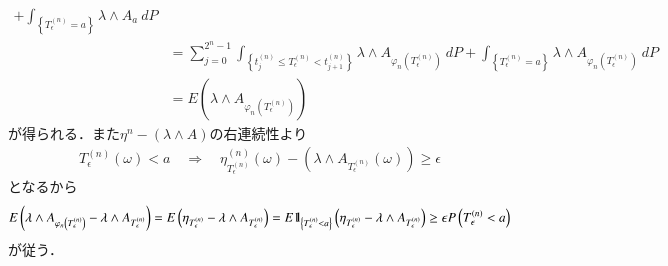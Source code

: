 \begin{prf}
\begin{description}
\begin{align}
						+ \int_{\left\{T^{(n)}_\epsilon = a\right\}} \lambda \wedge A_a\ dP \\
					&= \sum_{j=0}^{2^n-1} \int_{\left\{t^{(n)}_j \leq T^{(n)}_\epsilon < t^{(n)}_{j+1}\right\}} \lambda \wedge A_{\varphi_n\left(T^{(n)}_\epsilon\right)}\ dP
						+ \int_{\left\{T^{(n)}_\epsilon = a\right\}} \lambda \wedge A_{\varphi_n\left(T^{(n)}_\epsilon\right)}\ dP \\
					&= E\left(\lambda \wedge A_{\varphi_n\left(T^{(n)}_\epsilon\right)}\right)
				\end{align}
				が得られる．また$\eta^{n} - (\lambda \wedge A)$の右連続性より
				\begin{align}
					T^{(n)}_\epsilon(\omega) < a
					\quad \Longrightarrow
					\quad \eta^{(n)}_{T^{(n)}_\epsilon}(\omega) - \left(\lambda \wedge A_{T^{(n)}_\epsilon}(\omega)\right) \geq \epsilon
				\end{align}
				となるから
				\begin{align}
					E\left(\lambda \wedge A_{\varphi_n\left(T^{(n)}_\epsilon\right)}
						- \lambda \wedge A_{T^{(n)}_\epsilon} \right)
					= E\left(\eta_{T^{(n)}_\epsilon}
						- \lambda \wedge A_{T^{(n)}_\epsilon} \right)
					= E\mbox{1}\hspace{-0.25em}\mbox{l}_{\left\{T^{(n)}_\epsilon < a\right\}}\left(\eta_{T^{(n)}_\epsilon}
						- \lambda \wedge A_{T^{(n)}_\epsilon} \right)
					\geq \epsilon P\left(T^{(n)}_\epsilon < a\right)
					\label{eq:chapter_1_theorem_4_14_5}
				\end{align}
				が従う．
				

\end{description}
\end{prf}
